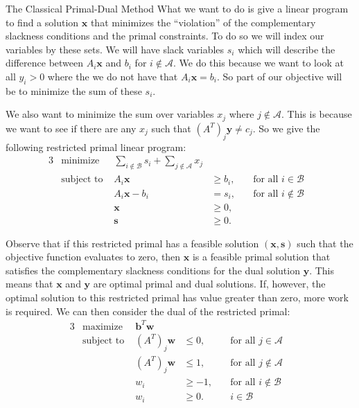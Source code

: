 \begin{section}{The Classical Primal-Dual Method}
	What we want to do is 
	give a linear program to find a solution $\mathbf{x}$ that minimizes the 
	``violation'' of the complementary slackness conditions and the primal constraints. To do 
	so we will index our variables by these sets. We will 
	have slack variables $s_i$ which will describe the difference between $A_i\mathbf{x}$ and $b_i$ 
	for $i\notin \mathcal{A}$. We do this because we want to look at all $y_i > 0$ where the 
	we do not 
	have that $A_i\mathbf{x} = b_i$. So part of our objective will be to minimize the 
	sum of these $s_i$. 
	
	We also want to minimize the sum over variables $x_j$ where 
	$j\notin \mathcal{A}$. 
	This is because we want to see if there are any $x_j$ such that $(A^{T})_j\mathbf{y} \neq c_j$. 
	So we give the following restricted primal linear program:
	\begin{alignat}{3}
		& \text{minimize } & \sum_{i\notin \mathcal{B}} s_i + \sum_{j\notin \mathcal{A}} x_j & \\
		& \text{subject to } & A_i\mathbf{x} & \geq b_i, & \quad \text{for all } i\in 
					\mathcal{B} & \\
				     && A_i\mathbf{x} - b_i & = s_i, & \quad \text{for all }i\notin 
				     	\mathcal{B} & \\
				     && \mathbf{x} & \geq 0, \\
				     && \mathbf{s} & \geq 0.
	\end{alignat}

	Observe that if this restricted primal has a feasible solution $(\mathbf{x},\mathbf{s})$ such 
	that the objective function evaluates to zero, then $\mathbf{x}$ is a feasible primal solution 
	that satisfies the complementary slackness conditions for the dual solution $\mathbf{y}$. This 
	means that $\mathbf{x}$ and $\mathbf{y}$ are optimal primal and dual solutions. If, however, 
	the optimal solution to this restricted primal has value greater than zero, more work is 
	required. We can then consider the dual of the restricted primal:
	\begin{alignat}{3}
		& \text{maximize } & \mathbf{b}^{T}\mathbf{w} & \\
		& \text{subject to } & (A^{T})_j\mathbf{w} & \leq 0, & \quad \text{for all }j\in 
					\mathcal{A} & \\
				     && (A^{T})_j\mathbf{w} & \leq 1, & \quad \text{for all } j\notin 
				     	\mathcal{A} & \\
				     && w_i & \geq -1, & \quad \text{for all }i\notin 
				     	\mathcal{B} & \\
				     && w_i & \geq 0. & \quad i\in \mathcal{B}
	\end{alignat}


\end{section}

